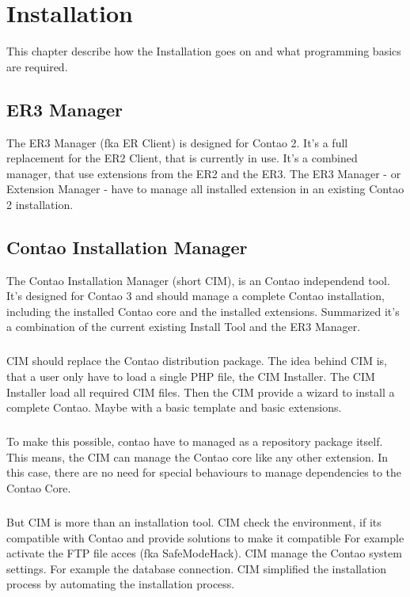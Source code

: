 \label{sec:installation} 
\chapter{Installation}

This chapter describe how the Installation goes on and what programming basics are required.

\section[sec:er3 manager]{ER3 Manager}

The ER3 Manager (fka ER Client) is designed for Contao 2. It's a full replacement for the ER2 Client, that is currently in use.
It's a combined manager, that use extensions from the ER2 and the ER3. The ER3 Manager - or Extension Manager - have to manage all installed extension in an existing Contao 2 installation.

\section[sec:contao installation manager]{Contao Installation Manager}

The Contao Installation Manager (short CIM), is an Contao independend tool. It's designed for Contao 3 and should manage a complete Contao installation, including the installed Contao core and the installed extensions.
Summarized it's a combination of the current existing Install Tool and the ER3 Manager.

\paragraph{}
CIM should replace the Contao distribution package.
The idea behind CIM is, that a user only have to load a single PHP file, the CIM Installer.
The CIM Installer load all required CIM files.
Then the CIM provide a wizard to install a complete Contao.
Maybe with a basic template and basic extensions.

\paragraph{}
To make this possible, contao have to managed as a repository package itself.
This means, the CIM can manage the Contao core like any other extension.
In this case, there are no need for special behaviours to manage dependencies to the Contao Core.

\paragraph{}
But CIM is more than an installation tool.
CIM check the environment, if its compatible with Contao and provide solutions to make it compatible
For example activate the FTP file acces (fka SafeModeHack).
CIM manage the Contao system settings.
For example the database connection.
CIM simplified the installation process by automating the installation process.

